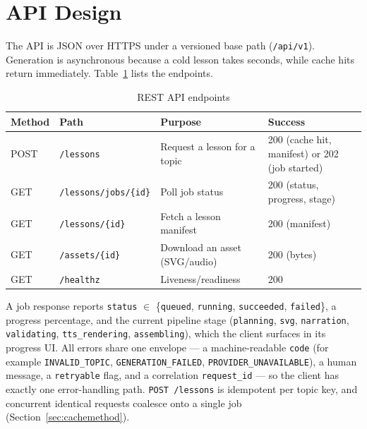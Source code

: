 \section{API Design}
\label{sec:apidesign}

The API is JSON over HTTPS under a versioned base path (\texttt{/api/v1}).
Generation is asynchronous because a cold lesson takes seconds, while cache
hits return immediately. Table~\ref{tab:api} lists the endpoints.

\begin{table}[htbp]
\caption{REST API endpoints}
\label{tab:api}
\centering
\small
\renewcommand{\arraystretch}{1.3}
\begin{tabular}{@{}llp{}p{}@{}}
\toprule
\textbf{Method} & \textbf{Path} & \textbf{Purpose} & \textbf{Success}\\
\midrule
POST & \texttt{/lessons} & Request a lesson for a topic & 200 (cache hit,
manifest) or 202 (job started)\\
GET & \texttt{/lessons/jobs/\{id\}} & Poll job status & 200 (status,
progress, stage)\\
GET & \texttt{/lessons/\{id\}} & Fetch a lesson manifest & 200 (manifest)\\
GET & \texttt{/assets/\{id\}} & Download an asset (SVG/audio) & 200 (bytes)\\
GET & \texttt{/healthz} & Liveness/readiness & 200\\
\bottomrule
\end{tabular}
\end{table}

A job response reports \texttt{status} $\in$ \{\texttt{queued},
\texttt{running}, \texttt{succeeded}, \texttt{failed}\}, a progress
percentage, and the current pipeline stage (\texttt{planning},
\texttt{svg}, \texttt{narration}, \texttt{validating},
\texttt{tts\_rendering}, \texttt{assembling}), which the client surfaces in
its progress UI. All errors share one envelope --- a machine-readable
\texttt{code} (for example \texttt{INVALID\_TOPIC},
\texttt{GENERATION\_FAILED}, \texttt{PROVIDER\_UNAVAILABLE}), a human
message, a \texttt{retryable} flag, and a correlation \texttt{request\_id}
--- so the client has exactly one error-handling path.
\texttt{POST /lessons} is idempotent per topic key, and concurrent identical
requests coalesce onto a single job (Section~\ref{sec:cachemethod}).

